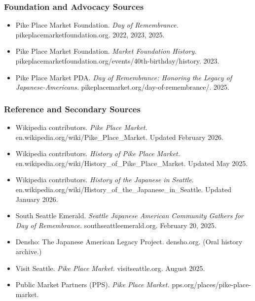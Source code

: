 \documentclass[11pt,letterpaper]{article}
\newcommand{\stageheader}[2]{%
  \noindent\colorbox{#2}{\makebox[\textwidth][l]{%
    \textcolor{white}{\bfseries\sffamily\hspace{6pt}#1\hspace{6pt}}}}%
  \vspace{0.5em}\par%
}
\begin{document}
\subsubsection{Foundation and Advocacy Sources}
\begin{itemize}[noitemsep]
  \item Pike Place Market Foundation. \textit{Day of Remembrance.} pikeplacemarketfoundation.org. 2022, 2023, 2025.
  \item Pike Place Market Foundation. \textit{Market Foundation History.} pikeplacemarketfoundation.org/events/40th-birthday/history. 2023.
  \item Pike Place Market PDA. \textit{Day of Remembrance: Honoring the Legacy of Japanese-Americans.} pikeplacemarket.org/day-of-remembrance/. 2025.
\end{itemize}

\subsubsection{Reference and Secondary Sources}
\begin{itemize}[noitemsep]
  \item Wikipedia contributors. \textit{Pike Place Market.} en.wikipedia.org/wiki/Pike\_Place\_Market. Updated February 2026.
  \item Wikipedia contributors. \textit{History of Pike Place Market.} en.wikipedia.org/wiki/History\_of\_Pike\_Place\_Market. Updated May 2025.
  \item Wikipedia contributors. \textit{History of the Japanese in Seattle.} en.wikipedia.org/wiki/History\_of\_the\_Japanese\_in\_Seattle. Updated January 2026.
  \item South Seattle Emerald. \textit{Seattle Japanese American Community Gathers for Day of Remembrance.} southseattleemerald.org. February 20, 2025.
  \item Densho: The Japanese American Legacy Project. densho.org. (Oral history archive.)
  \item Visit Seattle. \textit{Pike Place Market.} visitseattle.org. August 2025.
  \item Public Market Partners (PPS). \textit{Pike Place Market.} pps.org/places/pike-place-market.
\end{itemize}

\newpage

\stageheader{STAGE 3 --- MISSION PACKAGE}{tertiary}
\end{document}
